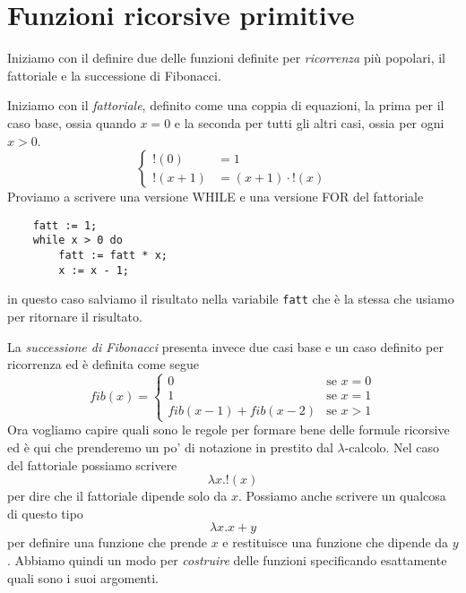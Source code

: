 \section{Funzioni ricorsive primitive}
Iniziamo con il definire due delle funzioni definite per
\emph{ricorrenza} più popolari, il fattoriale e la successione
di Fibonacci.

Iniziamo con il \emph{fattoriale}, definito come una coppia
di equazioni, la prima per il caso base, ossia quando $x = 0$
e la seconda per tutti gli altri casi, ossia per ogni $x > 0$.
\[
	\begin{cases}
		!(0)     & = 1                  \\
		!(x + 1) & = (x + 1) \cdot !(x)
	\end{cases}
\]
Proviamo a scrivere una versione WHILE e una versione FOR del
fattoriale
\begin{verbatim}
    fatt := 1;
    while x > 0 do
        fatt := fatt * x;
        x := x - 1;
\end{verbatim}
in questo caso salviamo il risultato nella variabile
\verb|fatt| che è la stessa che usiamo per ritornare il
risultato.

La \emph{successione di Fibonacci} presenta invece due casi
base e un caso definito per ricorrenza ed è definita come
segue
\[
	fib(x) = \begin{cases}
		0                       & \text{se } x = 0 \\
		1                       & \text{se } x = 1 \\
		fib(x - 1) + fib(x - 2) & \text{se } x > 1
	\end{cases}
\]
Ora vogliamo capire quali sono le regole per formare bene
delle formule ricorsive ed è qui che prenderemo un po' di
notazione in prestito dal $\lambda$-calcolo. Nel caso del
fattoriale possiamo scrivere
\[ \lambda x . !(x) \]
per dire che il fattoriale dipende solo da $x$. Possiamo anche
scrivere un qualcosa di questo tipo
\[ \lambda x . x + y \]
per definire una funzione che prende $x$ e restituisce una
funzione che dipende da $y$. Abbiamo quindi un modo per
\emph{costruire} delle funzioni specificando esattamente quali
sono i suoi argomenti.

